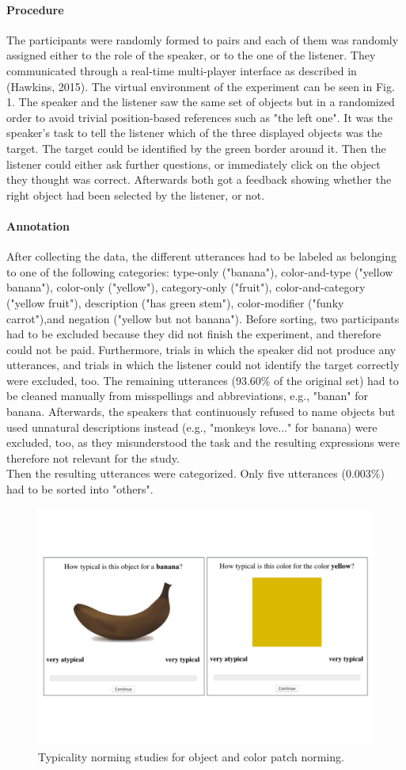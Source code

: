 \documentclass[10pt,letterpaper]{article}
\begin{document}
\paragraph{Procedure}
The participants were randomly formed to pairs and each of them was randomly assigned either to the role of the speaker, or to the one of the listener. They communicated through a real-time multi-player interface as described in (Hawkins, 2015). The virtual environment of the experiment can be seen in Fig. 1. The speaker and the listener saw the same set of objects but in a randomized order to avoid trivial position-based references such as "the left one". It was the speaker's task to tell the listener which of the three displayed objects was the target. The target could be identified by the green border around it. Then the listener could either ask further questions, or immediately click on the object they thought was correct. Afterwards both got a feedback showing whether the right object had been selected by the listener, or not.


\paragraph{Annotation}
After collecting the data, the different utterances had to be labeled as belonging to one of the following categories: type-only ("banana"), color-and-type ("yellow banana"),  color-only ("yellow"), category-only ("fruit"), color-and-category ("yellow fruit"), description ("has green stem"), color-modifier ("funky carrot"),and negation ("yellow but not banana"). Before sorting, two participants had to be excluded because they did not finish the experiment, and therefore could not be paid. Furthermore, trials in which the speaker did not produce any utterances, and trials in which the listener could not identify the target correctly were excluded, too. The remaining utterances (93.60\% of the original set) had to be cleaned manually from misspellings and abbreviations, e.g., "banan" for banana. Afterwards, the speakers that continuously refused to name objects but used unnatural descriptions instead (e.g., "monkeys love..." for banana) were excluded, too, as they misunderstood the task and the resulting expressions were therefore not relevant for the study.\\
Then the resulting utterances were categorized. Only five utterances (0.003\%) had to be sorted into "others".

\begin{figure}[bt!]
	\centering
	\includegraphics[width=.5\textwidth]{graphs/design_2}
	\caption{Typicality norming studies for object and color patch norming.
	}
	\label{fig:design_2}
\end{figure}
\end{document}
